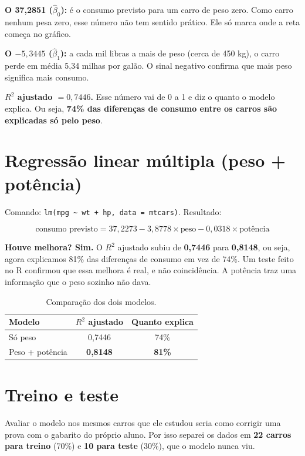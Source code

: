 \documentclass[11pt,a4paper]{article}
\begin{document}
\textbf{O 37,2851 ($\hat\beta_0$):} é o consumo previsto para um carro de peso zero. Como carro nenhum pesa zero, esse número não tem sentido prático. Ele só marca onde a reta começa no gráfico.

\textbf{O $-5{,}3445$ ($\hat\beta_1$):} a cada mil libras a mais de peso (cerca de 450 kg), o carro perde em média 5,34 milhas por galão. O sinal negativo confirma que mais peso significa mais consumo.

\textbf{$R^2$ ajustado $= 0{,}7446$.} Esse número vai de 0 a 1 e diz o quanto o modelo explica. Ou seja, \textbf{74\% das diferenças de consumo entre os carros são explicadas só pelo peso}.

\section{Regressão linear múltipla (peso + potência)}

Comando: \texttt{lm(mpg \textasciitilde{} wt + hp, data = mtcars)}. Resultado:

\[
\text{consumo previsto} = 37{,}2273 - 3{,}8778 \times \text{peso} - 0{,}0318 \times \text{potência}
\]

\textbf{Houve melhora? Sim.} O $R^2$ ajustado subiu de \textbf{0,7446} para \textbf{0,8148}, ou seja, agora explicamos 81\% das diferenças de consumo em vez de 74\%. Um teste feito no R confirmou que essa melhora é real, e não coincidência. A potência traz uma informação que o peso sozinho não dava.

\begin{table}[H]
\centering
\caption{Comparação dos dois modelos.}
\small
\begin{tabular}{lcc}
\toprule
\textbf{Modelo} & \textbf{$R^2$ ajustado} & \textbf{Quanto explica} \\
\midrule
Só peso & 0,7446 & 74\% \\
Peso + potência & \textbf{0,8148} & \textbf{81\%} \\
\bottomrule
\end{tabular}
\end{table}

\section{Treino e teste}

Avaliar o modelo nos mesmos carros que ele estudou seria como corrigir uma prova com o gabarito do próprio aluno. Por isso separei os dados em \textbf{22 carros para treino} (70\%) e \textbf{10 para teste} (30\%), que o modelo nunca viu.
\end{document}
